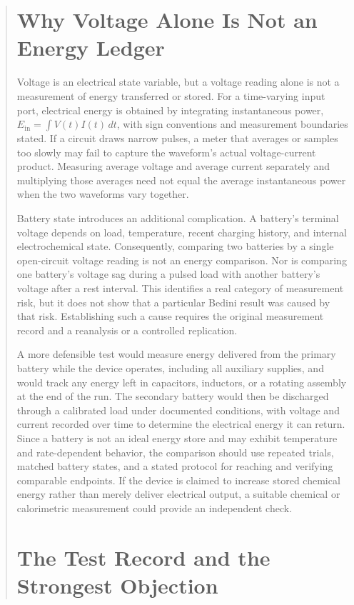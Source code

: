 \documentclass[11pt]{article}
\begin{document}
\begin{abstract}
\section{Why Voltage Alone Is Not an Energy Ledger}

Voltage is an electrical state variable, but a voltage reading alone is not a measurement of energy transferred or stored. For a time-varying input port, electrical energy is obtained by integrating instantaneous power, $E_{\mathrm{in}}=\int V(t)I(t)\,dt$, with sign conventions and measurement boundaries stated. If a circuit draws narrow pulses, a meter that averages or samples too slowly may fail to capture the waveform's actual voltage-current product. Measuring average voltage and average current separately and multiplying those averages need not equal the average instantaneous power when the two waveforms vary together.

Battery state introduces an additional complication. A battery's terminal voltage depends on load, temperature, recent charging history, and internal electrochemical state. Consequently, comparing two batteries by a single open-circuit voltage reading is not an energy comparison. Nor is comparing one battery's voltage sag during a pulsed load with another battery's voltage after a rest interval. This identifies a real category of measurement risk, but it does not show that a particular Bedini result was caused by that risk. Establishing such a cause requires the original measurement record and a reanalysis or a controlled replication.

A more defensible test would measure energy delivered from the primary battery while the device operates, including all auxiliary supplies, and would track any energy left in capacitors, inductors, or a rotating assembly at the end of the run. The secondary battery would then be discharged through a calibrated load under documented conditions, with voltage and current recorded over time to determine the electrical energy it can return. Since a battery is not an ideal energy store and may exhibit temperature and rate-dependent behavior, the comparison should use repeated trials, matched battery states, and a stated protocol for reaching and verifying comparable endpoints. If the device is claimed to increase stored chemical energy rather than merely deliver electrical output, a suitable chemical or calorimetric measurement could provide an independent check.

\section{The Test Record and the Strongest Objection}


\end{abstract}
\end{document}
